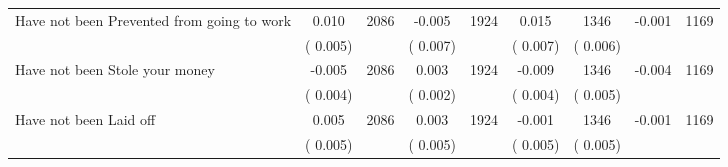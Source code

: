 \begin{tabular}{l*{8}{c}}
Have not been Prevented from going to work        &              0.010      &       2086       &             -0.005      &       1924       &              0.015      &       1346  &       -0.001 &       1169       \\
                       &       (       0.005)            &                               &       (       0.007)            &                               &       (       0.007)            &       (       0.006) &                  \\
Have not been Stole your money        &             -0.005      &       2086       &              0.003      &       1924       &             -0.009      &       1346  &       -0.004 &       1169       \\
                       &       (       0.004)            &                               &       (       0.002)            &                               &       (       0.004)            &       (       0.005) &                  \\
Have not been Laid off        &              0.005      &       2086       &              0.003      &       1924       &             -0.001      &       1346  &       -0.001 &       1169       \\
                       &       (       0.005)            &                               &       (       0.005)            &                               &       (       0.005)            &       (       0.005) &                  \\
\hline \end{tabular}